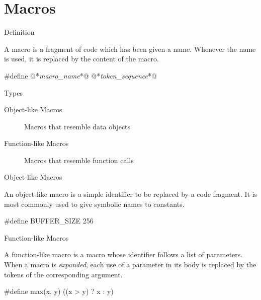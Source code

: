 \documentclass[compress]{beamer}
\begin{document}
\section{Macros}

\begin{slide}
	\begin{block}{Definition}

	A macro is a fragment of code which has been given a name.
	Whenever the name is used, it is replaced by the content of the macro.

	\begin{terminal}
	#define @*\textit{macro\_name}*@ @*\textit{token\_sequence}*@
	\end{terminal}

	\end{block}
\end{slide}

\begin{slide}
	\begin{block}{Types}

	\begin{description}
	\item[Object-like Macros] Macros that resemble data objects
	\item[Function-like Macros] Macros that resemble function calls
	\end{description}

	\end{block}
\end{slide}

\begin{slide}
	\begin{block}{Object-like Macros}

	An object-like macro is a simple identifier to be replaced by a code fragment.
	It is most commonly used to give symbolic names to constants.

	\begin{terminal}
	#define BUFFER_SIZE 256
	\end{terminal}

	\end{block}
\end{slide}

\begin{slide}
	\begin{block}{Function-like Macros}

	A function-like macro is a macro whose identifier follows a list of parameters.
	When a macro is \textit{expanded}, each use of a parameter in its body is replaced by the tokens of the corresponding argument.

	\begin{terminal}
	#define max(x, y) ((x > y) ? x : y)
	\end{terminal}

	\end{block}
\end{slide}
\end{document}
